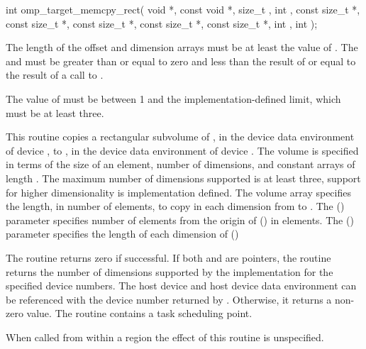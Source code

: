 \begin{ccppspecific}
\format
\begin{samepage}
\begin{ompcFunction}
int omp_target_memcpy_rect(
  void *,
  const void *,
  size_t ,
  int ,
  const size_t *,
  const size_t *,
  const size_t *,
  const size_t *,
  const size_t *,
  int ,
  int 
);
\end{ompcFunction}
\end{samepage}

\constraints
The length of the offset and dimension arrays must be at least the
value of .
The  and 
must be greater than or equal to zero and less than the result of
 or equal to the result of a call to
.

The value of  must be between 1 and the implementation-defined
limit, which must be at least three.


\effect

This routine copies a rectangular subvolume of ,
in the device data environment of device ,
to , in the device data environment of device .
The volume is specified in terms of the size of an element,
number of dimensions, and constant arrays of length .  The
maximum number of dimensions supported is at least three, support for higher
dimensionality is implementation defined. The volume array specifies the
length, in number of elements, to copy in each dimension from 
to . The  () parameter specifies
number of elements from the origin of  () in elements.
The  () parameter specifies the
length of each dimension of  ()

The routine returns zero if successful. If both  and  are
 pointers, the routine returns the number of dimensions supported
by the implementation for the specified device numbers. The host device and
host device data environment can be referenced with the device number returned
by .  Otherwise, it returns a non-zero value. The
routine contains a task scheduling point.

When called from within a  region
the effect of this routine is unspecified.


\end{ccppspecific}
